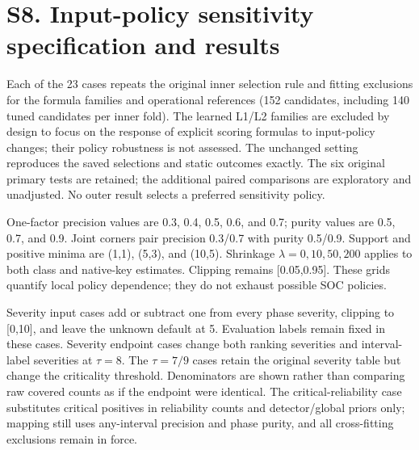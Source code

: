 \begin{tableorg}[htbp]
\centering\small
\caption{Forward-eligible scenarios in chronological order. Exact timestamp extents are supplied in forward\_split\_extents.csv. Training scenarios must end strictly before the test begins.}
\label{tab:s-forward}
\resizebox{\textwidth}{!}{}
\end{tableorg}

\begin{tableorg}[htbp]
\centering\small
\caption{Raw-alert service accounting, summed over scenarios. Starts include service extending past the horizon; busy time is truncated there. Aggregate overload permits temporary empty backlogs. The rates have identical accounting across rankers.}
\label{tab:s-util}
\resizebox{\textwidth}{!}{}
\end{tableorg}
\FloatBarrier
\section*{S8. Input-policy sensitivity specification and results}
Each of the 23 cases repeats the original inner selection rule and fitting exclusions for the formula families and operational references (152 candidates, including 140 tuned candidates per inner fold). The learned L1/L2 families are excluded by design to focus on the response of explicit scoring formulas to input-policy changes; their policy robustness is not assessed. The unchanged setting reproduces the saved selections and static outcomes exactly. The six original primary tests are retained; the additional paired comparisons are exploratory and unadjusted. No outer result selects a preferred sensitivity policy.

One-factor precision values are 0.3, 0.4, 0.5, 0.6, and 0.7; purity values are 0.5, 0.7, and 0.9. Joint corners pair precision 0.3/0.7 with purity 0.5/0.9. Support and positive minima are (1,1), (5,3), and (10,5). Shrinkage $\lambda=0,10,50,200$ applies to both class and native-key estimates. Clipping remains [0.05,0.95]. These grids quantify local policy dependence; they do not exhaust possible SOC policies.

Severity input cases add or subtract one from every phase severity, clipping to [0,10], and leave the unknown default at 5. Evaluation labels remain fixed in these cases. Severity endpoint cases change both ranking severities and interval-label severities at $\tau=8$. The $\tau=7/9$ cases retain the original severity table but change the criticality threshold. Denominators are shown rather than comparing raw covered counts as if the endpoint were identical. The critical-reliability case substitutes critical positives in reliability counts and detector/global priors only; mapping still uses any-interval precision and phase purity, and all cross-fitting exclusions remain in force.

